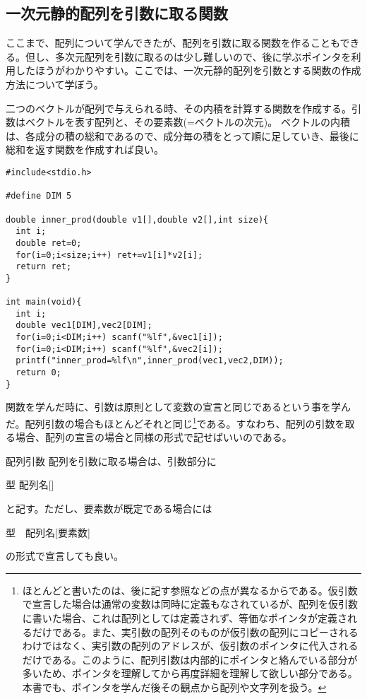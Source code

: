 \subsection{一次元静的配列を引数に取る関数}
ここまで、配列について学んできたが、配列を引数に取る関数を作ることもできる。但し、多次元配列を引数に取るのは少し難しいので、後に学ぶポインタを利用したほうがわかりやすい。ここでは、一次元静的配列を引数とする関数の作成方法について学ぼう。
\begin{boxnote}
二つのベクトルが配列で与えられる時、その内積を計算する関数を作成する。引数はベクトルを表す配列と、その要素数(=ベクトルの次元)。
ベクトルの内積は、各成分の積の総和であるので、成分毎の積をとって順に足していき、最後に総和を返す関数を作成すれば良い。
\begin{lstlisting}[caption=ベクトルの内積,label=program8_3]
#include<stdio.h>

#define DIM 5

double inner_prod(double v1[],double v2[],int size){
  int i;
  double ret=0;
  for(i=0;i<size;i++) ret+=v1[i]*v2[i];
  return ret;
}

int main(void){
  int i;
  double vec1[DIM],vec2[DIM];
  for(i=0;i<DIM;i++) scanf("%lf",&vec1[i]);
  for(i=0;i<DIM;i++) scanf("%lf",&vec2[i]);
  printf("inner_prod=%lf\n",inner_prod(vec1,vec2,DIM));
  return 0;
}
\end{lstlisting}
\end{boxnote}

関数を学んだ時に、引数は原則として変数の宣言と同じであるという事を学んだ。配列引数の場合もほとんどそれと同じ\footnote{ほとんどと書いたのは、後に記す参照などの点が異なるからである。仮引数で宣言した場合は通常の変数は同時に定義もなされているが、配列を仮引数に書いた場合、これは配列としては定義されず、等価なポインタが定義されるだけである。また、実引数の配列そのものが仮引数の配列にコピーされるわけではなく、実引数の配列のアドレスが、仮引数のポインタに代入されるだけである。このように、配列引数は内部的にポインタと絡んでいる部分が多いため、ポインタを理解してから再度詳細を理解して欲しい部分である。本書でも、ポインタを学んだ後その観点から配列や文字列を扱う。}である。すなわち、配列の引数を取る場合、配列の宣言の場合と同様の形式で記せばいいのである。
\begin{itembox}[l]{配列引数}
配列を引数に取る場合は、引数部分に
\begin{code}
型 配列名[]
\end{code}
と記す。ただし、要素数が既定である場合には
\begin{code}
型　配列名[要素数]
\end{code}
の形式で宣言しても良い。
\end{itembox}

